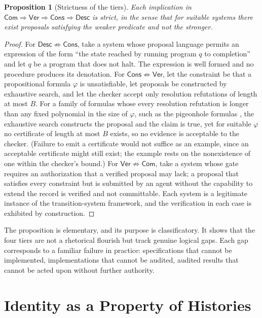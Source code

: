 \documentclass[11pt,twoside,openright]{book}
\theoremstyle{plain}
\newtheorem{proposition}[theorem]{Proposition}
\theoremstyle{definition}
\theoremstyle{remark}
\newcommand{\Desc}{\mathsf{Desc}}
\newcommand{\Cons}{\mathsf{Cons}}
\newcommand{\Ver}{\mathsf{Ver}}
\newcommand{\Com}{\mathsf{Com}}
\begin{document}
\begin{proposition}[Strictness of the tiers]\label{prop:strict}
Each implication in $\Com\Rightarrow\Ver\Rightarrow\Cons\Rightarrow\Desc$ is strict, in the sense that for suitable systems there exist proposals satisfying the weaker predicate and not the stronger.
\end{proposition}

\begin{proof}
For $\Desc\not\Rightarrow\Cons$, take a system whose proposal language permits an expression of the form ``the state reached by running program $q$ to completion'' and let $q$ be a program that does not halt. The expression is well formed and no procedure produces its denotation. For $\Cons\not\Rightarrow\Ver$, let the constraint be that a propositional formula $\varphi$ is unsatisfiable, let proposals be constructed by exhaustive search, and let the checker accept only resolution refutations of length at most $B$. For a family of formulas whose every resolution refutation is longer than any fixed polynomial in the size of $\varphi$, such as the pigeonhole formulas \cite{haken1985}, the exhaustive search constructs the proposal and the claim is true, yet for suitable $\varphi$ no certificate of length at most $B$ exists, so no evidence is acceptable to the checker. (Failure to emit a certificate would not suffice as an example, since an acceptable certificate might still exist; the example rests on the nonexistence of one within the checker's bound.) For $\Ver\not\Rightarrow\Com$, take a system whose gate requires an authorization that a verified proposal may lack; a proposal that satisfies every constraint but is submitted by an agent without the capability to extend the record is verified and not committable. Each system is a legitimate instance of the transition-system framework, and the verification in each case is exhibited by construction.
\end{proof}

The proposition is elementary, and its purpose is classificatory. It shows that the four tiers are not a rhetorical flourish but track genuine logical gaps. Each gap corresponds to a familiar failure in practice: specifications that cannot be implemented, implementations that cannot be audited, audited results that cannot be acted upon without further authority.

\section{Identity as a Property of Histories}
\end{document}
